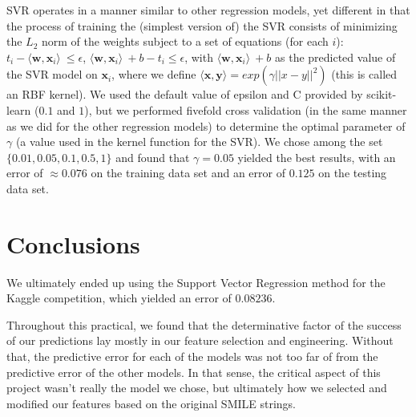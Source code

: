 \documentclass[11pt]{article}
\begin{document}
SVR operates in a manner similar to other regression models, yet different in that the process of training the (simplest version of) the SVR consists of minimizing the $L_2$ norm of the weights subject to a set of equations (for each $i$): $t_i -  \langle \textbf{w}, \textbf{x}_i\rangle\ \leq \epsilon $, $\langle \textbf{w}, \textbf{x}_i \rangle\ + b - t_i \leq \epsilon$, with $\langle \textbf{w}, \textbf{x}_i\rangle\ + b$ as the predicted value of the SVR model on $\textbf{x}_i$, where we define $\langle \textbf{x}, \textbf{y} \rangle = exp(\gamma||x - y||^2)$ (this is called an RBF kernel). We used the default value of epsilon and C provided by scikit-learn ($0.1$ and $1$), but we performed fivefold cross validation (in the same manner as we did for the other regression models) to determine the optimal parameter of $\gamma$ (a value used in the kernel function for the SVR). We chose among the set $\{0.01, 0.05, 0.1, 0.5, 1\}$ and found that $\gamma = 0.05$ yielded the best results, with an error of $\approx 0.076$ on the training data set and an error of $0.125$ on the testing data set.

\section{Conclusions}

We ultimately ended up using the Support Vector Regression method for the Kaggle competition, which yielded an error of $0.08236$.

Throughout this practical, we found that the determinative factor of the success of our predictions lay mostly in our feature selection and engineering. Without that, the predictive error for each of the models was not too far of from the predictive error of the other models. In that sense, the critical aspect of this project wasn't really the model we chose, but ultimately how we selected and modified our features based on the original SMILE strings.
\end{document}
